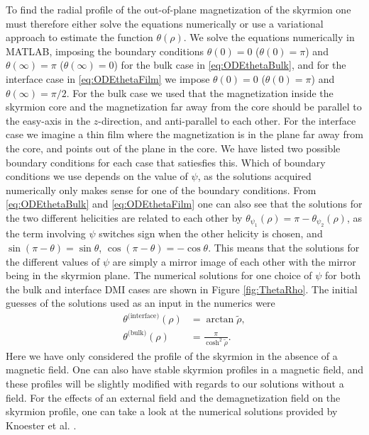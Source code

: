 \documentclass[12pt, a4paper, twoside, openright]{article}		%
\numberwithin{equation}{section}
\begin{document}
To find the radial profile of the out-of-plane magnetization of the skyrmion one must therefore either solve the equations numerically or use a variational approach to estimate the function $\theta(\rho)$. We solve the equations numerically in MATLAB, imposing the boundary conditions $\theta(0) = 0$ ($\theta(0) = \pi$) and $\theta(\infty) = \pi$ ($\theta(\infty) = 0$) for the bulk case in \eqref{eq:ODEthetaBulk}, and for the interface case in \eqref{eq:ODEthetaFilm} we impose $\theta(0) = 0$ ($\theta(0) = \pi$) and $\theta(\infty) = \pi/2$. For the bulk case we used that the magnetization inside the skyrmion core and the magnetization far away from the core should be parallel to the easy-axis in the $z$-direction, and anti-parallel to each other. For the interface case we imagine a thin film where the magnetization is in the plane far away from the core, and points out of the plane in the core. We have listed two possible boundary conditions for each case that satiesfies this. Which of boundary conditions we use depends on the value of $\psi$, as the solutions acquired numerically only makes sense for one of the boundary conditions. From \eqref{eq:ODEthetaBulk} and \eqref{eq:ODEthetaFilm} one can also see that the solutions for the two different helicities are related to each other by $\theta_{\psi_1}(\rho) = \pi - \theta_{\psi_2}(\rho)$, as the term involving $\psi$ switches sign when the other helicity is chosen, and $\sin(\pi-\theta) = \sin\theta$, $\cos(\pi-\theta) = -\cos\theta$. This means that the solutions for the different values of $\psi$ are simply a mirror image of each other with the mirror being in the skyrmion plane. The numerical solutions for one choice of $\psi$ for both the bulk and interface DMI cases are shown in Figure \ref{fig:ThetaRho}. The initial guesses of the solutions used as an input in the numerics were
\begin{align}
\theta^{\text{(interface)}}(\rho) &= \arctan\tilde{\rho}, \\
\theta^{\text{(bulk)}}(\rho) &= \frac{\pi}{\cosh^2\tilde{\rho}}.
\end{align}
Here we have only considered the profile of the skyrmion in the absence of a magnetic field. One can also have stable skyrmion profiles in a magnetic field, and these profiles will be slightly modified with regards to our solutions without a field. For the effects of an external field and the demagnetization field on the skyrmion profile, one can take a look at the numerical solutions provided by Knoester et al. \cite{Knoester2014}.
\end{document}
